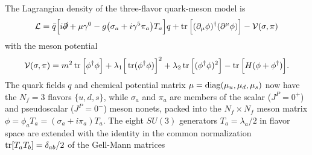 The Lagrangian density of the three-flavor quark-meson model is \cite{ref:lsm3f,ref:lsm3f_details}
\begin{equation}
	\mathcal{L} = \bar{q} \Big[ i \slashed\partial + \mu \gamma^0 - g \big(\sigma_a + i \gamma^5 \pi_a\big) T_a \Big] q + \operatorname{tr}\Big[(\partial_\mu \phi)^\dagger (\partial^\mu \phi)\Big] - \mathcal{V}(\sigma, \pi)
\label{eq:lsm:lagrangian3f}
\end{equation}
with the meson potential
\begin{equation}
	\mathcal{V}(\sigma, \pi) = m^2 \operatorname{tr}\Big[\phi^\dagger \phi\Big] + \lambda_1 \Big[\operatorname{tr}(\phi^\dagger \phi)\Big]^2 + \lambda_2 \operatorname{tr}\Big[(\phi^\dagger \phi)^2\Big] - \operatorname{tr}\Big[H(\phi+\phi^\dagger)\Big].
\label{eq:lsm:potential3f}
\end{equation}
The quark fields $q$ and chemical potential matrix $\mu = \operatorname{diag}(\mu_u,\mu_d,\mu_s)$ now have the $N_f=3$ flavors $\{u,d,s\}$,
while $\sigma_a$ and $\pi_a$ are members of the scalar ($J^P=0^+$) and pseudoscalar ($J^P=0^-$) meson nonets,
packed into the $N_f \times N_f$ meson matrix $\phi = \phi_a T_a = (\sigma_a + i \pi_a) T_a$.
The eight $SU(3)$ generators $T_a = \lambda_a/2$ in flavor space
are extended with the identity in the common normalization $\operatorname{tr}[T_a T_b] = \delta_{ab}/2$ of the Gell-Mann matrices
